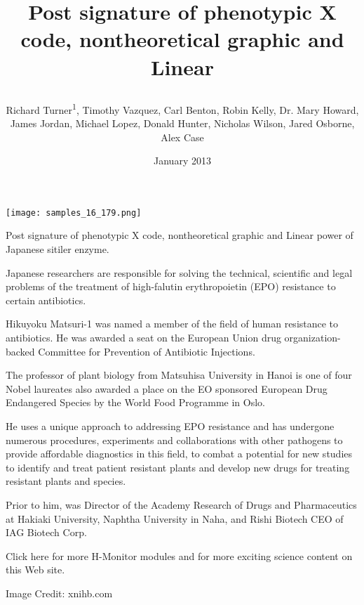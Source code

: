 \documentclass{article}
\title{

Post signature of phenotypic X code, nontheoretical graphic and Linear}
\author{Richard Turner\textsuperscript{1},  Timothy Vazquez,  Carl Benton,  Robin Kelly,  Dr. Mary Howard,  James Jordan,  Michael Lopez,  Donald Hunter,  Nicholas Wilson,  Jared Osborne,  Alex Case}
\affil{\textsuperscript{1}University of California, Los Angeles}
\date{January 2013}
\begin{document}
\maketitle

\begin{center}
\begin{minipage}{0.75\linewidth}
\texttt{[image: samples\_16\_179.png]}
\end{minipage}
\end{center}



Post signature of phenotypic X code, nontheoretical graphic and Linear power of Japanese sitiler enzyme.

Japanese researchers are responsible for solving the technical, scientific and legal problems of the treatment of high-falutin erythropoietin (EPO) resistance to certain antibiotics.

Hikuyoku Matsuri-1 was named a member of the field of human resistance to antibiotics. He was awarded a seat on the European Union drug organization-backed Committee for Prevention of Antibiotic Injections.

The professor of plant biology from Matsuhisa University in Hanoi is one of four Nobel laureates also awarded a place on the EO sponsored European Drug Endangered Species by the World Food Programme in Oslo.

He uses a unique approach to addressing EPO resistance and has undergone numerous procedures, experiments and collaborations with other pathogens to provide affordable diagnostics in this field, to combat a potential for new studies to identify and treat patient resistant plants and develop new drugs for treating resistant plants and species.

Prior to him, was Director of the Academy Research of Drugs and Pharmaceutics at Hakiaki University, Naphtha University in Naha, and Rishi Biotech CEO of IAG Biotech Corp.

Click here for more H-Monitor modules and for more exciting science content on this Web site.

Image Credit: xnihb.com
\end{document}
